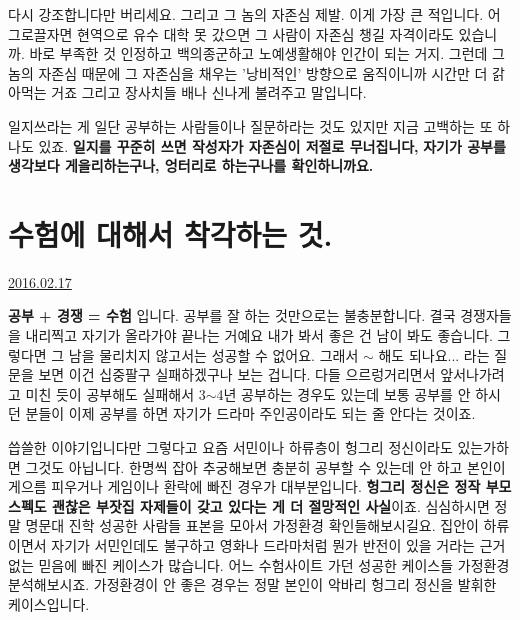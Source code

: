 다시 강조합니다만 버리세요. 그리고 그 놈의 자존심 제발.
이게 가장 큰 적입니다.
어그로끌자면 현역으로 유수 대학 못 갔으면 그 사람이 자존심 챙길 자격이라도 있습니까.
바로 부족한 것 인정하고 백의종군하고 노예생활해야 인간이 되는 거지.
그런데 그 놈의 자존심 때문에 그 자존심을 채우는 '낭비적인' 방향으로 움직이니까 시간만 더 갉아먹는 거죠
그리고 장사치들 배나 신나게 불려주고 말입니다.
\vspace{5mm}

일지쓰라는 게 일단 공부하는 사람들이나 질문하라는 것도 있지만
지금 고백하는 또 하나도 있죠.
\textbf{일지를 꾸준히 쓰면 작성자가 자존심이 저절로 무너집니다,}
\textbf{자기가 공부를 생각보다 게을리하는구나, 엉터리로 하는구나를 확인하니까요.}
\vspace{5mm}






\section{수험에 대해서 착각하는 것.}
\href{https://www.kockoc.com/Apoc/638785}{2016.02.17}

\vspace{5mm}

\textbf{공부 + 경쟁 = 수험} 입니다.
공부를 잘 하는 것만으로는 불충분합니다. 결국 경쟁자들을 내리찍고 자기가 올라가야 끝나는 거예요
내가 봐서 좋은 건 남이 봐도 좋습니다. 그렇다면 그 남을 물리치지 않고서는 성공할 수 없어요.
그래서 $\sim$ 해도 되나요... 라는 질문을 보면 이건 십중팔구 실패하겠구나 보는 겁니다.
다들 으르렁거리면서 앞서나가려고 미친 듯이 공부해도 실패해서 3$\sim$4년 공부하는 경우도 있는데
보통 공부를 안 하시던 분들이 이제 공부를 하면 자기가 드라마 주인공이라도 되는 줄 안다는 것이죠.
\vspace{5mm}

씁쓸한 이야기입니다만
그렇다고 요즘 서민이나 하류층이 헝그리 정신이라도 있는가하면 그것도 아닙니다.
한명씩 잡아 추궁해보면 충분히 공부할 수 있는데 안 하고 본인이 게으름 피우거나 게임이나 환락에 빠진 경우가 대부분입니다.
\textbf{헝그리 정신은 정작 부모 스펙도 괜찮은 부잣집 자제들이 갖고 있다는 게 더 절망적인 사실}이죠.
심심하시면 정말 명문대 진학 성공한 사람들 표본을 모아서 가정환경 확인들해보시길요.
집안이 하류이면서 자기가 서민인데도 불구하고 영화나 드라마처럼 뭔가 반전이 있을 거라는 근거없는 믿음에 빠진 케이스가 많습니다.
어느 수험사이트 가던 성공한 케이스들 가정환경 분석해보시죠.
가정환경이 안 좋은 경우는 정말 본인이 악바리 헝그리 정신을 발휘한 케이스입니다.
\vspace{5mm}

